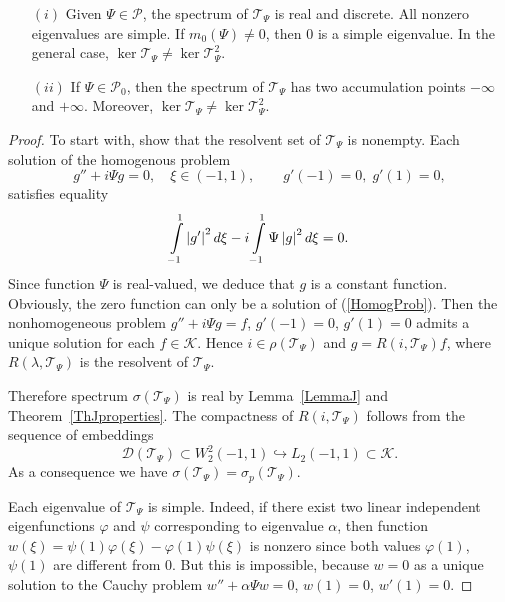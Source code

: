 \documentclass[11pt,english]{amsart}%
\begin{document}
\begin{g_theorem}\label{ThSpectrumOfT}%
\begin{itemize}%
\item[$(i)$] Given $\Psi\in \mathcal{P}$, the spectrum of  $\mathcal{T}_\Psi$ is real and discrete.
All nonzero eigenvalues are simple. If $m_0(\Psi)\neq0$, then $0$ is a simple eigenvalue.
In the general case, $\ker \mathcal{T}_\Psi\neq\ker \mathcal{T}_\Psi^2$.

\item[$(ii)$] If $\Psi\in \mathcal{P}_0$, then the spectrum of $\mathcal{T}_\Psi$ has two accumulation points $-\infty$ and $+\infty$. Moreover, $\ker \mathcal{T}_\Psi\neq \ker \mathcal{T}_\Psi^2$.
\end{itemize}
\end{g_theorem}
\begin{proof}
To start with, show that the resolvent set of $\mathcal{T}_\Psi$ is nonempty.
Each solution of the homogenous problem
\begin{equation}
\label{HomogProb}
g''+i\Psi g=0,\quad\xi\in(-1,1),\qquad
g'(-1)=0,\; g'(1)=0,
\end{equation}
satisfies equality
$$
\int\limits_{-1}^1\left\vert g'\right\vert^2d\xi-i\int\limits_{-1}^1\Psi\left\vert g\right\vert^2d\xi=0.
$$
Since function $\Psi$ is real-valued, we deduce that $g$ is a constant function.
Obviously, the zero function can only be a solution of (\ref{HomogProb}).
Then the nonhomogeneous problem $g''+i\Psi g=f$, $g'(-1)=0$, $ g'(1)=0$ admits a unique solution
for each $f\in \mathcal{K}$. Hence $i\in \rho(\mathcal{T}_\Psi)$ and $g=R(i,\mathcal{T}_\Psi)f$, where $R(\lambda,\mathcal{T}_\Psi)$ is the resolvent of  $\mathcal{T}_\Psi$.



Therefore spectrum  $\sigma(\mathcal{T}_\Psi)$ is real by
Lemma~\ref{LemmaJ} and Theorem~\ref{ThJproperties}. The compactness of $R(i,\mathcal{T}_\Psi)$ follows from
the sequence of embeddings
$$
\mathcal{D}(\mathcal{T}_\Psi)\subset W_2^2(-1,1)\hookrightarrow L_2(-1,1)\subset
\mathcal{K}.
$$
As a consequence we have $\sigma(\mathcal{T}_\Psi)=\sigma_p(\mathcal{T}_\Psi)$.




Each eigenvalue of $\mathcal{T}_\Psi$ is simple. Indeed, if there exist two linear independent
eigenfunctions $\varphi$ and $\psi$ corresponding to eigenvalue $\alpha$, then function
$w(\xi)=\psi(1)\varphi(\xi)-\varphi(1)\psi(\xi)$ is nonzero since both values
$\varphi(1)$, $\psi(1)$ are different from $0$.
But this is impossible, because $w=0$ as a unique solution to the Cauchy problem $w''+\alpha\Psi w=0$, $w(1)=0$, $w'(1)=0$.


\end{proof}
\end{document}
